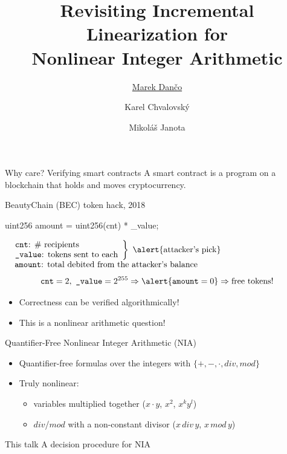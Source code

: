 \documentclass[11pt]{beamer}
\title{Revisiting Incremental Linearization for\\Nonlinear Integer Arithmetic}
\author{\underline{Marek Dančo} \and Karel Chvalovský \and Mikoláš Janota}
\institute{Czech Technical University in Prague}
\date{}
\newcommand{\divc}[2]{#1\,\mathit{div}\,#2}
\newcommand{\modc}[2]{#1\,\mathit{mod}\,#2}
\begin{document}
\maketitle

\begin{frame}{Why care? Verifying smart contracts}
	A \alert{smart contract} is a program on a blockchain that holds
	and moves cryptocurrency.
	\begin{block}{BeautyChain (BEC) token hack, 2018}
		\small
		\begin{semiverbatim}
			\alert{uint256} amount = uint256(cnt) * \_value;
		\end{semiverbatim}
		\normalsize
		$\begin{array}{l}
				\left.
				\begin{array}{l}
					\texttt{cnt}\text{: \# recipients} \\
					\texttt{\_value}\text{: tokens sent to each}
				\end{array}
				\right\}\ \alert{\text{attacker's pick}} \\
					\hphantom{x}\texttt{amount}\text{: total debited from the attacker's balance}
			\end{array}$
		\[
			\texttt{cnt}=2,\ \texttt{\_value}=2^{255}
			\Rightarrow \alert{\text{\texttt{amount}}=0}
			\Rightarrow \text{free tokens!}
		\]
	\end{block}
	\pause
	\begin{itemize}
		\item Correctness can be verified algorithmically!
		\item This is a nonlinear arithmetic question!
	\end{itemize}
\end{frame}

\begin{frame}{Quantifier-Free Nonlinear Integer Arithmetic (NIA)}
	\begin{itemize}
		\item Quantifier-free formulas over the \alert{integers} with
		      $\{+,-,\cdot,\mathit{div},\mathit{mod}\}$
		\item Truly nonlinear:
		      \begin{itemize}
			      \item variables multiplied together ($x\cdot y$, $x^2$, $x^ky^l$)
			      \item $\mathit{div}$/$\mathit{mod}$ with a \alert{non-constant divisor}
			            ($\divc{x}{y}$, $\modc{x}{y}$)
		      \end{itemize}
	\end{itemize}
	\begin{block}{This talk}
		A decision procedure for NIA
	\end{block}
\end{frame}
\end{document}
